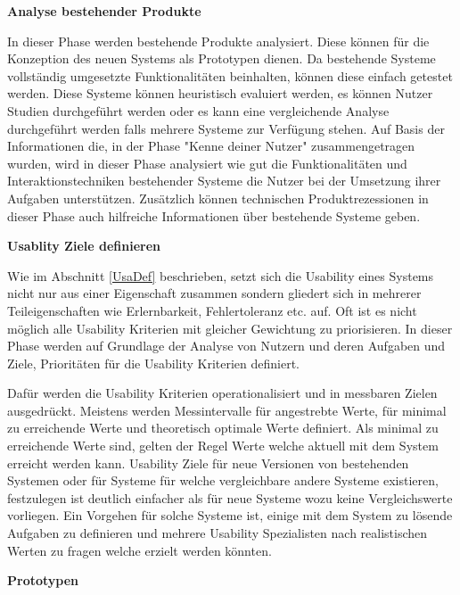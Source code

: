 \vspace{5mm}
\textbf{Analyse bestehender Produkte} 
 
In dieser Phase werden bestehende Produkte analysiert. Diese können für die Konzeption des neuen Systems als Prototypen dienen. Da bestehende Systeme vollständig 
umgesetzte Funktionalitäten beinhalten, können diese einfach getestet werden.    
Diese Systeme können heuristisch evaluiert werden, es können Nutzer Studien durchgeführt werden oder es kann eine vergleichende Analyse durchgeführt werden falls mehrere Systeme zur 
Verfügung stehen. Auf Basis der Informationen die, in der Phase "Kenne deiner Nutzer" zusammengetragen wurden, wird in dieser Phase analysiert wie gut die Funktionalitäten und Interaktionstechniken 
bestehender Systeme die Nutzer bei der Umsetzung ihrer Aufgaben unterstützen. Zusätzlich können technischen Produktrezessionen in dieser Phase auch hilfreiche Informationen über bestehende Systeme geben. 

\vspace{5mm} 
\textbf{Usablity Ziele definieren} 

Wie im Abschnitt \ref{UsaDef} beschrieben, setzt sich die Usability eines Systems nicht nur aus einer Eigenschaft zusammen sondern gliedert sich in mehrerer Teileigenschaften wie Erlernbarkeit, Fehlertoleranz etc. auf. 
Oft ist es nicht möglich alle Usability Kriterien mit gleicher Gewichtung zu priorisieren. In dieser Phase werden auf Grundlage der Analyse von Nutzern und deren Aufgaben und Ziele, Prioritäten für die Usability Kriterien definiert. 

Dafür werden die Usability Kriterien operationalisiert und in messbaren Zielen ausgedrückt. Meistens werden Messintervalle für angestrebte Werte, für minimal zu erreichende Werte und theoretisch optimale Werte definiert. 
Als minimal zu erreichende Werte sind, gelten der Regel Werte welche aktuell mit dem System erreicht werden kann. Usability Ziele für neue Versionen von bestehenden Systemen oder für Systeme für welche vergleichbare andere 
Systeme existieren, festzulegen ist deutlich einfacher als für neue Systeme wozu keine Vergleichswerte vorliegen. Ein Vorgehen für solche Systeme ist, einige mit dem System zu lösende Aufgaben zu definieren und mehrere Usability Spezialisten nach realistischen Werten zu fragen welche erzielt werden könnten.

\vspace{5mm} 
\textbf{Prototypen}


